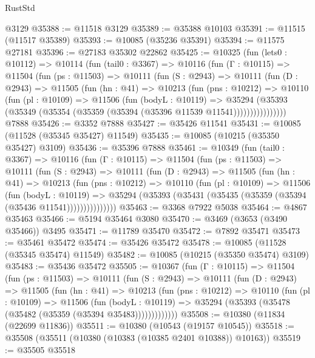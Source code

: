 \begin{lexlean}{RustStd}
\begin{coremodule}
    @3129
@35388 := @11518 @3129
@35389 := @35388 @10103
@35391 := @11515 (@11517 @35389)
@35393 := @10085 (@35236 @35391)
@35394 := @11575 @27181
@35396 := @27183 @35302 @22862
@35425 := @10325
    (fun (lets0 : @10112) =>
    @10114
      (fun (tail0 : @3367) =>
      @10116
        (fun (Γ : @10115) =>
        @11504
          (fun (ps : @11503) =>
          @10111
            (fun (S : @2943) =>
            @10111
              (fun (D : @2943) =>
              @11505
                (fun (hn : @41) =>
                @10213
                  (fun (pns : @10212) =>
                  @10110
                    (fun (pl : @10109) =>
                    @11506
                      (fun (bodyL : @10119) =>
                      @35294
                        (@35393
                          (@35349 (@35354 (@35359 (@35394 (@35396 @11539 @11541))))))))))))))))
    @7888
@35426 := @3352 @7888
@35427 := @35426 @11541
@35431 := @10085 (@11528 (@35345 @35427) @11549)
@35435 := @10085 (@10215 (@35350 @35427) @3109)
@35436 := @35396 @7888
@35461 := @10349
    (fun (tail0 : @3367) =>
    @10116
      (fun (Γ : @10115) =>
      @11504
        (fun (ps : @11503) =>
        @10111
          (fun (S : @2943) =>
          @10111
            (fun (D : @2943) =>
            @11505
              (fun (hn : @41) =>
              @10213
                (fun (pns : @10212) =>
                @10110
                  (fun (pl : @10109) =>
                  @11506
                    (fun (bodyL : @10119) =>
                    @35294 (@35393 (@35431 (@35435 (@35359 (@35394 (@35436 @11541)))))))))))))))
@35463 := @3368 @7922 @5038
@35464 := @4867 @35463
@35466 := @5194 @35464 @3080
@35470 := @3469 (@3653 (@3490 @35466)) @3495
@35471 := @11789 @35470
@35472 := @7892 @35471
@35473 := @35461 @35472
@35474 := @35426 @35472
@35478 := @10085 (@11528 (@35345 @35474) @11549)
@35482 := @10085 (@10215 (@35350 @35474) @3109)
@35483 := @35436 @35472
@35505 := @10367
    (fun (Γ : @10115) =>
    @11504
      (fun (ps : @11503) =>
      @10111
        (fun (S : @2943) =>
        @10111
          (fun (D : @2943) =>
          @11505
            (fun (hn : @41) =>
            @10213
              (fun (pns : @10212) =>
              @10110
                (fun (pl : @10109) =>
                @11506
                  (fun (bodyL : @10119) =>
                  @35294 (@35393 (@35478 (@35482 (@35359 (@35394 @35483)))))))))))))
@35508 := @10380 (@11834 (@22699 @11836))
@35511 := @10380 (@10543 (@19157 @10545))
@35518 := @35508 (@35511 (@10380 (@10383 (@10385 @2401 @10388)) @10163))
@35519 := @35505 @35518

\end{coremodule}
\end{lexlean}
